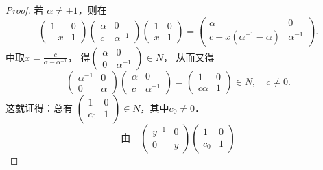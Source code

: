 \begin{proof}
    若 $\alpha \neq \pm 1$，则在
    \begin{equation*}
        \begin{pmatrix} 1 & 0 \\ -x & 1 \end{pmatrix}
        \begin{pmatrix}  \alpha  & 0 \\  c & \alpha^{-1} \end{pmatrix}
        \begin{pmatrix}  1 & 0 \\   x & 1 \end{pmatrix} =
        \begin{pmatrix} 
            \alpha  & 0 \\
            c+x \left(\alpha^{-1}-\alpha \right) & \alpha^{-1}
        \end{pmatrix} .
    \end{equation*}
    中取$x=\frac{c}{\alpha-\alpha^{-1}}$，
    得$\left(\begin{smallmatrix} \alpha & 0 \\ 0 & \alpha^{-1}\end{smallmatrix}\right) \in N$，
    从而又得
    \begin{equation*}
        \begin{pmatrix} \alpha^{-1} & 0 \\ 0 & \alpha \end{pmatrix}
        \begin{pmatrix} \alpha & 0 \\ c & \alpha^{-1} \end{pmatrix}=
        \begin{pmatrix} 1 & 0 \\ c \alpha  & 1 \end{pmatrix} 
        \in N,\quad c \neq 0 .
    \end{equation*}
    这就证得：总有 $\left(\begin{smallmatrix} 1 & 0 \\ c_0  & 1 \end{smallmatrix}\right) \in N $，其中$c_0 \neq 0$．
    \begin{equation*}
        \text{由}\quad
        \begin{pmatrix}  y^{-1} & 0 \\  0 & y \end{pmatrix} 
        \begin{pmatrix}  1 & 0 \\   c_0 & 1   \end{pmatrix} 

\end{equation*}
\end{proof}
